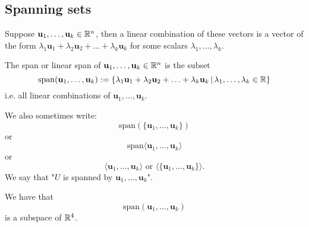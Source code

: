 \documentclass[10pt, a4paper]{article}
\newcommand{\mbf}[1]{\mathbf{#1}}
\begin{document}
\subsection{Spanning sets}
Suppose $\mbf{u}_1, \dotsc, \mbf{u}_k \in \R ^ n$,
then a linear combination of these vectors is a vector of the form
$\lambda_1\mbf{u}_1 + \lambda_2\mbf{u}_2 + \dotsc + \lambda_k\mbf{u}_k$ for some scalars $\lambda_1, \dotsc, \lambda_k$.

\begin{definition}
    The span or linear span of $\mbf{u}_1, \dotsc, \mbf{u}_k \in \R ^ n$ is the subset
    \[
    \mathrm{span}(\mbf{u}_1, \dotsc, \mbf{u}_k) := \{\lambda_1\mbf{u}_1 + \lambda_2\mbf{u}_2 + \dotsc + \lambda_k\mbf{u}_k\,|\, \lambda_1, \dotsc, \lambda_k \in \R\}
    \]
    i.e. all linear combinations of $\mbf{u}_1, \dotsc, \mbf{u}_k$.
\end{definition}
We also sometimes write:
\[
\mathrm{span}(\{\mbf{u}_1, \dotsc, \mbf{u}_k\})
\]
or
\[
\mathrm{span}\langle\mbf{u}_1, \dotsc, \mbf{u}_k\rangle
\]
or
\[
\langle\mbf{u}_1, \dotsc, \mbf{u}_k\rangle\text{ or } \langle\{\mbf{u}_1, \dotsc, \mbf{u}_k\}\rangle.
\]
We say that "$U$ is spanned by $\mbf{u}_1, \dotsc, \mbf{u}_k$".

\begin{proposition}
    We have that
    \[
    \mathrm{span}(\mbf{u}_1, \dotsc, \mbf{u}_k)
    \]
    is a subspace of $\mathbb{R} ^ 4$.
\end{proposition}
\end{document}
